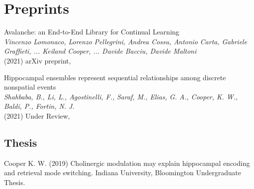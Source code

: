 \documentclass[10pt]{cooperCV2}
\begin{document}
 



\section{Preprints} 
\begin{etaremune}[ itemindent=-\bibhang, topsep=0pt,
				   itemsep=\bibsep,partopsep=0pt,parsep=0pt,leftmargin={\bibhang+\widthof{[999]}}] 
    
    \item Avalanche: an End-to-End Library for Continual Learning \\
     \textit{Vincenzo Lomonaco, Lorenzo Pellegrini, Andrea Cossu, Antonio Carta, Gabriele Graffieti, ... Keiland Cooper, ... Davide Bacciu, Davide Maltoni}\\
     (2021) arXiv preprint, 
     
	
    \item Hippocampal ensembles represent sequential relationships among discrete nonspatial events \\
     \textit{Shahbaba, B., Li, L., Agostinelli, F., Saraf, M., Elias, G. A., Cooper, K. W., Baldi, P.,  Fortin, N. J.}\\
     (2021) Under Review, 
     
	


\end{etaremune}





\vspace{0.1in}
\subsection{Thesis} 

\begin{etaremune}[resume,  itemindent=-\bibhang, topsep=0pt,
				   itemsep=\bibsep,partopsep=0pt,parsep=0pt,leftmargin={\bibhang+\widthof{[999]}}] 
    \item Cooper K. W. (2019) Cholinergic modulation may explain hippocampal encoding and retrieval mode switching. Indiana University, Bloomington Undergraduate Thesis. 

\end{etaremune}
\end{document}
